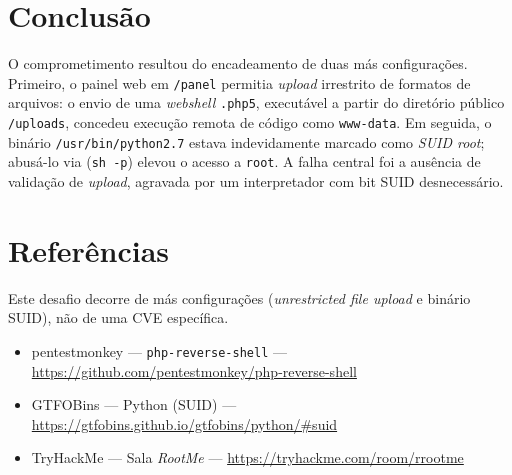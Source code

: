 \documentclass[12pt,a4paper]{article}
\begin{document}
\section{Conclusão}
O comprometimento resultou do encadeamento de duas más configurações. Primeiro,
o painel web em \texttt{/panel} permitia \emph{upload} irrestrito de formatos de arquivos:
o envio de uma \emph{webshell} \texttt{.php5}, executável a partir do diretório
público \texttt{/uploads}, concedeu execução remota de código como
\texttt{www-data}. Em seguida, o binário \texttt{/usr/bin/python2.7} estava
indevidamente marcado como \emph{SUID root}; abusá-lo via (\texttt{sh -p}) elevou o acesso a \texttt{root}. A falha central foi a
ausência de validação de \emph{upload}, agravada por um interpretador com bit
SUID desnecessário.

\section{Referências}
Este desafio decorre de más configurações (\emph{unrestricted file upload} e
binário SUID), não de uma CVE específica.
\begin{itemize}[leftmargin=1.5em]
  \item pentestmonkey --- \texttt{php-reverse-shell} ---
        \url{https://github.com/pentestmonkey/php-reverse-shell}
  \item GTFOBins --- Python (SUID) ---
        \url{https://gtfobins.github.io/gtfobins/python/\#suid}
  \item TryHackMe --- Sala \emph{RootMe} ---
        \url{https://tryhackme.com/room/rrootme}
\end{itemize}
\end{document}
